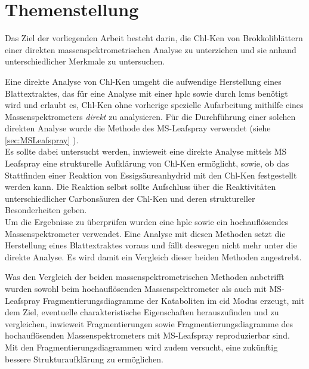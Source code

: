 \chapter{Themenstellung}

Das Ziel der vorliegenden Arbeit besteht darin, die \gls{Chl-K}en von Brokkoliblättern einer direkten massenspektrometrischen Analyse zu unterziehen und sie anhand unterschiedlicher Merkmale zu untersuchen.

Eine direkte Analyse von \gls{Chl-K}en umgeht die aufwendige Herstellung eines Blattextraktes, das für eine Analyse mit einer \gls{hplc} sowie durch \gls{lcms} benötigt wird und erlaubt es, \gls{Chl-K}en ohne vorherige spezielle Aufarbeitung mithilfe eines Massenspektrometers \textit{direkt} zu analysieren. \cite{DirectPlantTissue} Für die Durchführung einer solchen direkten Analyse wurde die Methode des MS-Leafspray \cite{LeafSpray} verwendet (siehe \ref{sec:MSLeafspray} ). \\

Es sollte dabei untersucht werden, inwieweit eine direkte Analyse mittels MS Leafspray eine strukturelle Aufklärung von \gls{Chl-K}en ermöglicht, sowie, ob das Stattfinden einer Reaktion von Essigsäureanhydrid mit den \gls{Chl-K}en festgestellt werden kann. Die Reaktion selbst sollte Aufschluss über die Reaktivitäten unterschiedlicher Carbonsäuren der \gls{Chl-K}en und deren struktureller Besonderheiten geben. \\

Um die Ergebnisse zu überprüfen wurden eine \gls{hplc} sowie ein hochauflösendes Massenspektrometer verwendet. Eine Analyse mit diesen Methoden setzt die Herstellung eines Blattextraktes voraus und fällt deswegen nicht mehr unter die direkte Analyse. Es wird damit ein Vergleich dieser beiden Methoden angestrebt. 

Was den Vergleich der beiden massenspektrometrischen Methoden anbetrifft wurden sowohl beim hochauflösenden Massenspektrometer als auch mit MS-Leafspray Fragmentierungsdiagramme der Kataboliten im \gls{cid} Modus erzeugt, mit dem Ziel, eventuelle charakteristische Eigenschaften herauszufinden und zu vergleichen, inwieweit Fragmentierungen sowie Fragmentierungsdiagramme des hochauflösenden Massenspektrometers mit MS-Leafspray reproduzierbar sind. Mit den Fragmentierungsdiagrammen wird zudem versucht, eine zukünftig bessere Strukturaufklärung zu ermöglichen.




